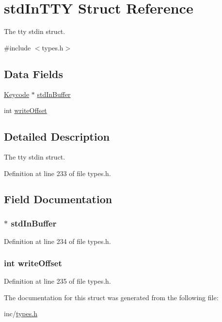 \hypertarget{structstd_in_t_t_y}{
\section{stdInTTY Struct Reference}
\label{structstd_in_t_t_y}
}


The tty stdin struct.  




{\ttfamily \#include $<$types.h$>$}

\subsection*{Data Fields}
\begin{DoxyCompactItemize}
\item 
\hyperlink{types_8h_a90ed3c9028a7fa45665d10b5210fa142}{Keycode} $\ast$ \hyperlink{structstd_in_t_t_y_adbc1696a6e5a5d97b6761336fc185945}{stdInBuffer}
\item 
int \hyperlink{structstd_in_t_t_y_ada738b143166d2de18a92ff55801f41b}{writeOffset}
\end{DoxyCompactItemize}


\subsection{Detailed Description}
The tty stdin struct. 

Definition at line 233 of file types.h.



\subsection{Field Documentation}
\hypertarget{structstd_in_t_t_y_adbc1696a6e5a5d97b6761336fc185945}{
\subsubsection[{stdInBuffer}]{$\ast$ {\bf stdInBuffer}}}
\label{structstd_in_t_t_y_adbc1696a6e5a5d97b6761336fc185945}


Definition at line 234 of file types.h.

\hypertarget{structstd_in_t_t_y_ada738b143166d2de18a92ff55801f41b}{
\subsubsection[{writeOffset}]{\setlength{\rightskip}{0pt plus 5cm}int {\bf writeOffset}}}
\label{structstd_in_t_t_y_ada738b143166d2de18a92ff55801f41b}


Definition at line 235 of file types.h.



The documentation for this struct was generated from the following file:\begin{DoxyCompactItemize}
\item 
inc/\hyperlink{types_8h}{types.h}\end{DoxyCompactItemize}
